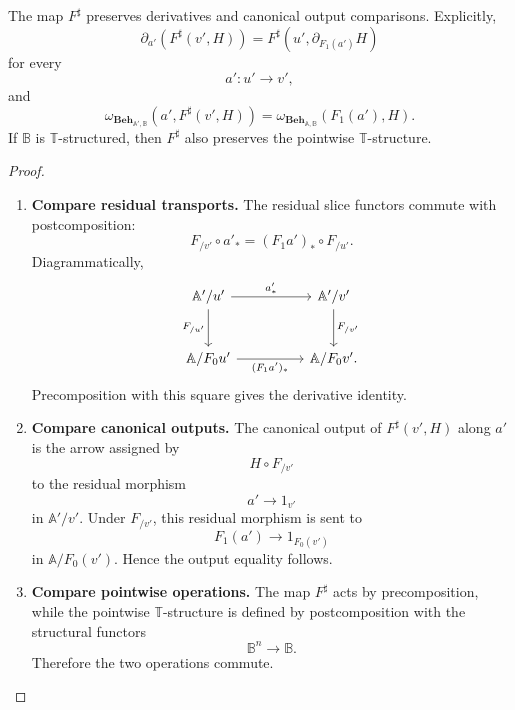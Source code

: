 \begin{lemma}
\label{lem:global-reindexing-preserves-structure}
    The map \(F^\sharp\) preserves derivatives and canonical output
    comparisons. Explicitly,
    \[
        \partial_{a'}(F^\sharp(v',H))
        =
        F^\sharp(u',\partial_{F_1(a')}H)
    \]
    for every
    \[
        a':u'\to v',
    \]
    and
    \[
        \omega_{\mathbf{Beh}_{\mathbb A',\mathbb B}}
        (a',F^\sharp(v',H))
        =
        \omega_{\mathbf{Beh}_{\mathbb A,\mathbb B}}
        (F_1(a'),H).
    \]
    If \(\mathbb B\) is \(\mathbb T\)-structured, then \(F^\sharp\) also
    preserves the pointwise \(\mathbb T\)-structure.
\end{lemma}

\begin{proof}
    \leavevmode
    \begin{enumerate}
        \item \textbf{Compare residual transports.}
        The residual slice functors commute with postcomposition:
        \[
            F_{/v'}\circ a'_*
            =
            (F_1a')_*\circ F_{/u'}.
        \]
        Diagrammatically,
        \[
        \begin{tikzcd}[column sep=huge, row sep=large]
            \mathbb A'/u'
                \arrow[r, "a'_*"]
                \arrow[d, "F_{/u'}"']
            &
            \mathbb A'/v'
                \arrow[d, "F_{/v'}"]
            \\
            \mathbb A/F_0u'
                \arrow[r, "{(F_1a')_*}"']
            &
            \mathbb A/F_0v'.
        \end{tikzcd}
        \]
        Precomposition with this square gives the derivative identity.

        \item \textbf{Compare canonical outputs.}
        The canonical output of \(F^\sharp(v',H)\) along \(a'\) is the arrow
        assigned by
        \[
            H\circ F_{/v'}
        \]
        to the residual morphism
        \[
            a'\to 1_{v'}
        \]
        in \(\mathbb A'/v'\). Under \(F_{/v'}\), this residual morphism is sent
        to
        \[
            F_1(a')\to 1_{F_0(v')}
        \]
        in \(\mathbb A/F_0(v')\). Hence the output equality follows.

        \item \textbf{Compare pointwise operations.}
        The map \(F^\sharp\) acts by precomposition, while the pointwise
        \(\mathbb T\)-structure is defined by postcomposition with the
        structural functors
        \[
            \mathbb B^n\to\mathbb B.
        \]
        Therefore the two operations commute.
    \end{enumerate}
\end{proof}

